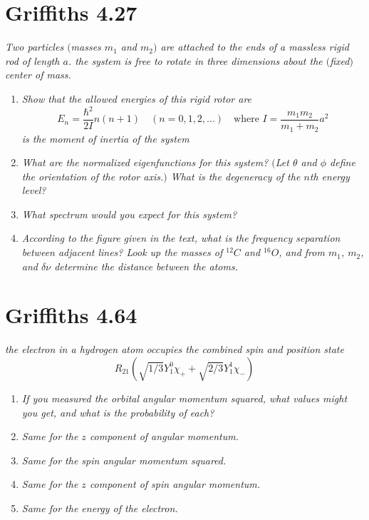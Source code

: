 \documentclass[12pt]{article}
\begin{document}
\section*{Griffiths 4.27}
{\sl Two particles $($masses $m_1$ and $m_2)$ are attached to the ends of a massless rigid rod of length $a$. the system is free to rotate in three dimensions about the $($fixed$)$ center of mass.}
\begin{enumerate}[label=\alph*)]
\item {\sl Show that the allowed energies of this rigid rotor are}
\[E_n = \frac{\hbar^2}{2I}n(n+1) \quad (n = 0,1,2,...) \quad \text{where } I = \frac{m_1 m_2}{m_1 + m_2}a^2\]
{\sl is the moment of inertia of the system}

\item {\sl What are the normalized eigenfunctions for this system? $($Let $\theta$ and $\phi$ define the orientation of the rotor axis.$)$ What is the degeneracy of the $n$th energy level?}

\item {\sl What spectrum would you expect for this system?}

\item {\sl According to the figure given in the text, what is the frequency separation between adjacent lines? Look up the masses of $^{12}C$ and $^{16}O$, and from $m_1$, $m_2$, and $\delta \nu$ determine the distance between the atoms.}

\end{enumerate}


\section*{Griffiths 4.64}
{\sl the electron in a hydrogen atom occupies the combined spin and position state}
\[R_{21}(\sqrt{1/3}Y^0_1 \chi_+ + \sqrt{2/3}Y^1_1 \chi_-)\]
\begin{enumerate}[label=\alph*)]
\item {\sl If you measured the orbital angular momentum squared, what values might you get, and what is the probability of each? }

\item {\sl Same for the $z$ component of angular momentum.}

\item {\sl Same for the spin angular momentum squared.}

\item {\sl Same for the $z$ component of spin angular momentum.}

\item {\sl Same for the energy of the electron.}
\end{enumerate}
\end{document}
